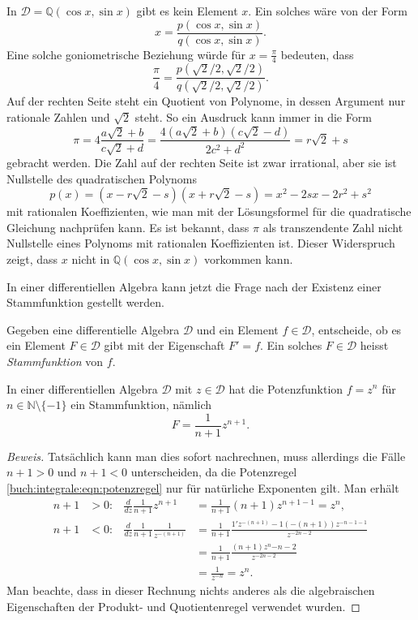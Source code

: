 \begin{beispiel}
In $\mathscr{D}=\mathbb{Q}(\cos x,\sin x)$ gibt es kein Element $x$.
Ein solches wäre von der Form
\[
x = \frac{p(\cos x,\sin x)}{q(\cos x,\sin x)}.
\]
Eine solche goniometrische Beziehung würde für $x=\frac{\pi}4$ bedeuten,
dass
\[
\frac{\pi}4
=
\frac{p(\sqrt{2}/2,\sqrt{2}/2)}{q(\sqrt{2}/2,\sqrt{2}/2)}.
\]
Auf der rechten Seite steht ein Quotient von Polynome, in dessen
Argument nur rationale Zahlen und $\sqrt{2}$ steht.
So ein Ausdruck kann immer in die Form
\[
\pi
=
4\frac{a\sqrt{2}+b}{c\sqrt{2}+d}
=
\frac{4(a\sqrt{2}+b)(c\sqrt{2}-d)}{2c^2+d^2}
=
r\sqrt{2}+s
\]
gebracht werden.
Die Zahl auf der rechten Seite ist zwar irrational, aber sie ist Nullstelle
des quadratischen Polynoms
\[
p(x)
=
(x-r\sqrt{2}-s)(x+r\sqrt{2}-s)
=
x^2
-2sx
-2r^2+s^2
\]
mit rationalen Koeffizienten, wie man mit der Lösungsformel für die
quadratische Gleichung nachprüfen kann.
Es ist bekannt, dass $\pi$ als transzendente Zahl nicht Nullstelle
eines Polynoms mit rationalen Koeffizienten ist.
Dieser Widerspruch zeigt, dass $x$ nicht in $\mathbb{Q}(\cos x, \sin x)$
vorkommen kann.
\end{beispiel}

In einer differentiellen Algebra kann jetzt die Frage nach der
Existenz einer Stammfunktion gestellt werden.

\begin{aufgabe}
\label{buch:integrale:aufgabe:existenz-stammfunktion}
Gegeben eine differentielle Algebra $\mathscr{D}$ und ein Element
$f\in\mathscr{D}$, entscheide, ob es ein Element $F\in\mathscr{D}$ 
gibt mit der Eigenschaft $F'=f$.
Ein solches $F\in\mathscr{D}$ heisst {\em Stammfunktion} von $f$.
\end{aufgabe}

\begin{satz}
In einer differentiellen Algebra $\mathscr{D}$ mit $z\in\mathscr{D}$
hat die Potenzfunktion $f=z^n$ für $n\in\mathbb{N}\setminus\{-1\}$
ein Stammfunktion, nämlich 
\[
F = \frac{1}{n+1} z^{n+1}.
\]
\label{buch:integrale:satz:potenzstammfunktion}
\end{satz}

\begin{proof}[Beweis]
Tatsächlich kann man dies sofort nachrechnen, muss allerdings die
Fälle $n+1 >0$ und $n+1<0$ unterscheiden, da die Potenzregel
\eqref{buch:integrale:eqn:potenzregel} nur für natürliche Exponenten
gilt.
Man erhält
\begin{align*}
n+1&>0\colon
&
\frac{d}{dz}\frac{1}{n+1}z^{n+1}
&=
\frac{1}{n+1}(n+1)z^{n+1-1}
=
z^n,
\\
n+1&<0\colon
&
\frac{d}{dz}\frac{1}{n+1}\frac{1}{z^{-(n+1)}}
&=
\frac{1}{n+1}\frac{1'z^{-(n+1)}-1(-(n+1))z^{-n-1-1}}{z^{-2n-2}}
\\
&&
&=
\frac{1}{n+1}
\frac{(n+1)z^n{-n-2}}{z^{-2n-2}}
\\
&&
&=
\frac{1}{z^{-n}}=z^n.
\end{align*}
Man beachte, dass in dieser Rechnung nichts anderes als die
algebraischen Eigenschaften der Produkt- und Quotientenregel
verwendet wurden.
\end{proof}

